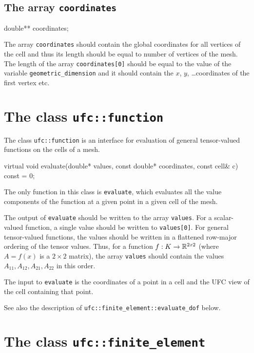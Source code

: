 \subsection{The array \texttt{coordinates}}

\begin{code}
double** coordinates;
\end{code}

The array \texttt{coordinates} should contain the global coordinates
for all vertices of the cell and thus its length should be equal to
number of vertices of the mesh. The length of the array
\texttt{coordinates[0]} should be equal to the value of the variable
\texttt{geometric\_dimension} and it should contain the $x$, $y$,
\ldots coordinates of the first vertex etc.

\section{The class \texttt{ufc::function}}

The class \texttt{ufc::function} is an interface for evaluation of
general tensor-valued functions on the cells of a mesh.

\begin{code}
virtual void evaluate(double* values,
                      const double* coordinates,
                      const cell& c) const = 0;
\end{code}

The only function in this class is \texttt{evaluate}, which evaluates
all the value components of the function at a given point in a given
cell of the mesh.

The output of \texttt{evaluate} should be written to the array
\texttt{values}. For a scalar-valued function, a single value should be
written to \texttt{values[0]}. For general tensor-valued functions,
the values should be written in a flattened row-major ordering of the
tensor values. Thus, for a function $f : K \rightarrow \mathbb{R}^{2x2}$ (where $A =
f(x)$ is a $2 \times 2$ matrix), the array \texttt{values} should contain
the values $A_{11}, A_{12}, A_{21}, A_{22}$ in this order.

The input to \texttt{evaluate} is the coordinates of a point in a cell
and the UFC view of the cell containing that point.

See also the description of
\texttt{ufc::finite\_element::evaluate\_dof} below.

\section{The class \texttt{ufc::finite\_element}}

